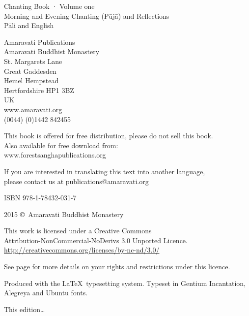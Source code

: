 
\thispagestyle{empty}

{\centering\small
\setlength{\parskip}{15pt}

{\normalsize
Chanting Book · Volume one\\
Morning and Evening Chanting (Pūjā) and Reflections\\
Pāli and English}

Amaravati Publications\\
Amaravati Buddhist Monastery\\
St. Margarets Lane\\
Great Gaddesden\\
Hemel Hempstead\\
Hertfordshire HP1 3BZ\\
UK\\
www.amaravati.org\\
(0044) (0)1442 842455

This book is offered for free distribution, please do not sell this book.\\
Also available for free download from:\\
www.forestsanghapublications.org

If you are interested in translating this text into another language,\\
please contact us at publications@amaravati.org

ISBN 978-1-78432-031-7

2015 \copyright\ Amaravati Buddhist Monastery

\vfill

This work is licensed under a Creative Commons\\
Attribution-NonCommercial-NoDerivs 3.0 Unported Licence.\\
\href{http://creativecommons.org/licenses/by-nc-nd/3.0/}{http://creativecommons.org/licenses/by-nc-nd/3.0/}

See page \pageref{copyright-details} for more details on your rights and restrictions under this licence.

Produced with the \LaTeX\ typesetting system. Typeset in Gentium Incantation,\\
Alegreya and Ubuntu fonts.

This edition\ldots



}

